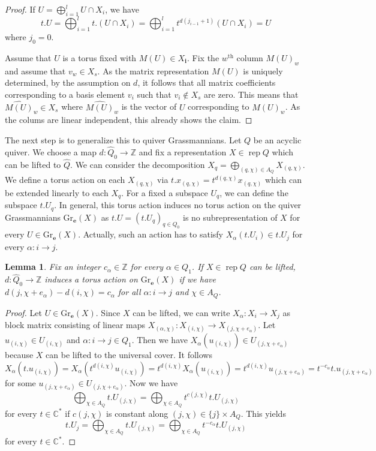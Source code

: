 \documentclass{amsart}
\newtheorem{lemma}[theorem]{Lemma}
\newcommand{\bfe}{\mathbf{e}}
\newcommand{\bfi}{\mathbf{i}}
\newcommand{\C}{\mathbb{C}}
\newcommand{\rep}{\operatorname{rep}}
\newcommand{\Gr}{\mathrm{Gr}}
\newcommand{\ZZ}{\mathbb{Z}}
\begin{document}
\begin{proof}
  If $U=\bigoplus_{i=1}^l U\cap X_i$, we have 
\[t.U=\bigoplus_{i=1}^l t.(U\cap X_i)=\bigoplus_{i=1}^l t^{d(j_{i-1}+1)}(U\cap X_i)=U\]
where $j_0=0$.

Assume that $U$ is a torus fixed with $M(U)\in X_{\bfi}$. Fix the $w^{\mathrm{th}}$ column $M(U)_w$ and assume that $v_{w}\in X_s$. As the matrix representation $M(U)$ is uniquely determined, by the assumption on $d$, it follows that all matrix coefficients corresponding to a basis element $v_i$ such that $v_i\notin X_s$ are zero. This means that $\widehat{M(U)}_w\in X_s$ where $\widehat{M(U)}_w$ is the vector of $U$ corresponding to $M(U)_w$. As the colums are linear independent, this already shows the claim.
\end{proof}
The next step is to generalize this to quiver Grassmannians. Let $Q$ be an acyclic quiver. We choose a map $d:\hat Q_0\to\ZZ$ and fix a representation $X\in\rep Q$ which can be lifted to $\hat Q$. We can consider the decomposition $X_q=\bigoplus_{(q,\chi)\in A_Q} X_{(q,\chi)}$. We define a torus action on each $X_{(q,\chi)}$ via $t.x_{(q,\chi)}=t^{d(q,\chi)}x_{(q,\chi)}$ which can be extended linearly to each $X_q$. For a fixed a subspace $U_q$, we can define the subspace $t.U_q$. In general, this torus action induces no torus action on the quiver Grassmannians $\Gr_{\bfe}(X)$ as $t.U=(t.U_q)_{q\in Q_0}$ is no subrepresentation of $X$ for every $U\in \Gr_{\bfe}(X)$. Actually, such an action has to satisfy $X_{\alpha}(t.U_i)\in t.U_j$ for every $\alpha:i\to j$. 
\begin{lemma}Fix an integer $c_\alpha\in\ZZ$ for every $\alpha\in Q_1$.
If $X\in\rep Q$ can be lifted, $d:\hat Q_0\to\ZZ$ induces a torus action on $\Gr_\bfe(X)$ if we have $d(j,\chi+e_\alpha)-d(i,\chi)=c_\alpha$ for all $\alpha:i\to j$ and $\chi\in A_{Q}$.
\end{lemma}
\begin{proof} 
  Let $U\in \Gr_\bfe(X)$. Since $X$ can be lifted, we can write $X_\alpha:X_i\to X_j$ as block matrix consisting of linear maps $X_{(\alpha,\chi)}:X_{(i,\chi)}\to X_{(j,\chi+e_\alpha)}$. Let $u_{(i,\chi)}\in U_{(i,\chi)}$ and $\alpha:i\to j\in Q_1$. Then we have $X_\alpha(u_{(i,\chi)})\in U_{(j,\chi+e_\alpha)}$ because $X$ can be lifted to the universal cover. It follows
\[X_\alpha(t.u_{(i,\chi)})=X_\alpha(t^{d(i,\chi)}u_{(i,\chi)})=t^{d(i,\chi)}X_\alpha(u_{(i,\chi)})=t^{d(i,\chi)}u_{(j,\chi+e_\alpha)}=t^{-c_\alpha}t.u_{(j,\chi+e_\alpha)}\]
for some $u_{(j,\chi+e_\alpha)}\in U_{(j,\chi+e_\alpha)}$.
Now we have \[\bigoplus_{\chi\in A_Q} t.U_{(j,\chi)}=\bigoplus_{\chi\in A_Q}t^{c(j,\chi)}t.U_{(j,\chi)}\]
for every $t\in\C^\ast$ if $c(j,\chi)$ is constant along $(j,\chi)\in \{j\}\times A_Q$. This yields  
\[t.U_j=\bigoplus_{\chi\in A_Q} t.U_{(j,\chi)}=\bigoplus_{\chi\in A_Q}t^{-c_\alpha}t.U_{(j,\chi)}\]
for every $t\in \C^\ast$.
\end{proof}
\end{document}
